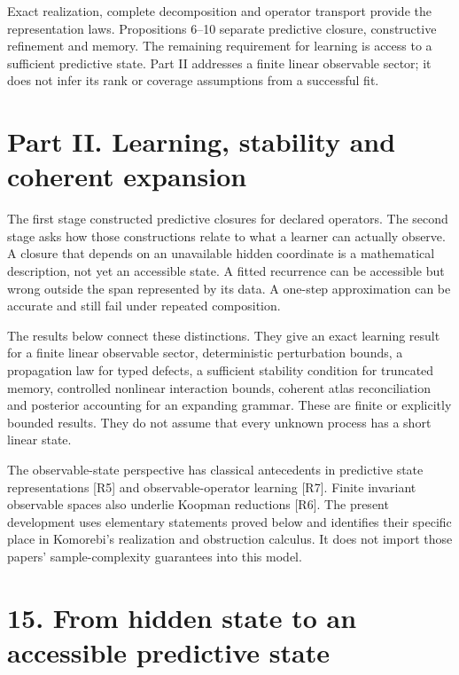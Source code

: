 \documentclass[11pt,letterpaper]{article}
\begin{document}
Exact realization, complete decomposition and operator transport provide
the representation laws. Propositions 6--10 separate predictive closure,
constructive refinement and memory. The remaining requirement for
learning is access to a sufficient predictive state. Part II addresses a
finite linear observable sector; it does not infer its rank or coverage
assumptions from a successful fit.

\newpage

\section{Part II. Learning, stability and coherent
expansion}\label{part-ii.-learning-stability-and-coherent-expansion}

The first stage constructed predictive closures for declared operators.
The second stage asks how those constructions relate to what a learner
can actually observe. A closure that depends on an unavailable hidden
coordinate is a mathematical description, not yet an accessible state. A
fitted recurrence can be accessible but wrong outside the span
represented by its data. A one-step approximation can be accurate and
still fail under repeated composition.

The results below connect these distinctions. They give an exact
learning result for a finite linear observable sector, deterministic
perturbation bounds, a propagation law for typed defects, a sufficient
stability condition for truncated memory, controlled nonlinear
interaction bounds, coherent atlas reconciliation and posterior
accounting for an expanding grammar. These are finite or explicitly
bounded results. They do not assume that every unknown process has a
short linear state.

The observable-state perspective has classical antecedents in predictive
state representations {[}R5{]} and observable-operator learning
{[}R7{]}. Finite invariant observable spaces also underlie Koopman
reductions {[}R6{]}. The present development uses elementary statements
proved below and identifies their specific place in Komorebi's
realization and obstruction calculus. It does not import those papers'
sample-complexity guarantees into this model.

\section{15. From hidden state to an accessible predictive
state}\label{from-hidden-state-to-an-accessible-predictive-state}
\end{document}
